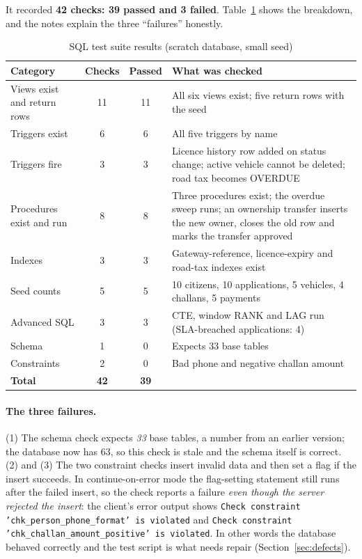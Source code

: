 It recorded \textbf{42 checks: 39 passed and 3 failed}. Table~\ref{tab:sqlsuite} shows
the breakdown, and the notes explain the three ``failures'' honestly.

\begin{table}[H]
\centering\small
\caption{SQL test suite results (scratch database, small seed)}\label{tab:sqlsuite}
\begin{tabularx}{\linewidth}{@{}p{3.3cm}ccX@{}}
\toprule \textbf{Category} & \textbf{Checks} & \textbf{Passed} & \textbf{What was checked}\\ \midrule
Views exist and return rows & 11 & 11 & All six views exist; five return rows with the seed\\
Triggers exist & 6 & 6 & All five triggers by name\\
Triggers fire & 3 & 3 & Licence history row added on status change; active vehicle cannot be deleted; road tax becomes OVERDUE\\
Procedures exist and run & 8 & 8 & Three procedures exist; the overdue sweep runs; an ownership transfer inserts the new owner, closes the old row and marks the transfer approved\\
Indexes & 3 & 3 & Gateway-reference, licence-expiry and road-tax indexes exist\\
Seed counts & 5 & 5 & 10 citizens, 10 applications, 5 vehicles, 4 challans, 5 payments\\
Advanced SQL & 3 & 3 & CTE, window RANK and LAG run (SLA-breached applications: 4)\\
Schema & 1 & 0 & Expects 33 base tables\\
Constraints & 2 & 0 & Bad phone and negative challan amount\\
\midrule
\textbf{Total} & \textbf{42} & \textbf{39} & \\
\bottomrule
\end{tabularx}
\end{table}

\paragraph{The three failures.}
(1) The schema check expects \emph{33} base tables, a number from an earlier version; the
database now has 63, so this check is stale and the schema itself is correct. (2) and (3)
The two constraint checks insert invalid data and then set a flag if the insert
succeeds. In continue-on-error mode the flag-setting statement still runs after the failed
insert, so the check reports a failure \emph{even though the server rejected the insert}:
the client's error output shows \texttt{Check constraint 'chk\_person\_phone\_format' is
violated} and \texttt{Check constraint 'chk\_challan\_amount\_positive' is violated}. In
other words the database behaved correctly and the test script is what needs repair
(Section~\ref{sec:defects}).

